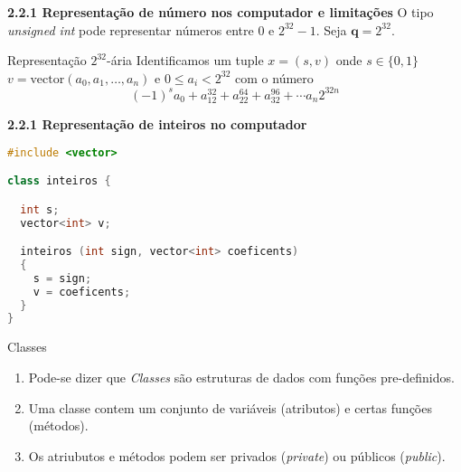 \documentclass{beamer}
\newcommand{\q}{\mathbf{q}}
\newcommand{\cvector}[1]{\mathrm{vector}(#1)}
\begin{document}
\begin{frame}{\bf 2.}{\bf 2.1 Representação de número nos computador e limitações}
O tipo {\it unsigned int} pode representar números entre $0$ e $2^{32}-1$. Seja $\q=2^{32}$.

\begin{block}{Representação $2^{32}$-ária}
Identificamos um tuple $x=(s,v)$ onde $s\in \{0,1\}$ $v=\cvector{a_0,a_1,\ldots, a_n}$ e $0\leq a_i < 2^{32}$ com o número 
$$ (-1)^s a_0 + a_12^{32} + a_22^{64} + a_32^{96} + \cdots a_n2^{32n}$$
\end{block}


\end{frame}



\begin{frame}[fragile]{\bf 2.}{\bf 2.1 Representação de inteiros no computador}

\begin{lstlisting}[language=C++]
#include <vector>

class inteiros {

  int s;
  vector<int> v;

  inteiros (int sign, vector<int> coeficents)
  {
    s = sign;
    v = coeficents;
  }
}

\end{lstlisting}
\end{frame}


\begin{frame}{Classes}

\begin{enumerate} 
 \item \pause Pode-se dizer que {\it Classes} são estruturas de dados com funções pre-definidos.
\item \pause Uma classe contem um conjunto de variáveis (atributos) e certas funções (métodos).
\item \pause Os atriubutos  e métodos podem ser privados ({\it private}) ou públicos ({\it public}).
\end{enumerate}

\end{frame}
\end{document}
